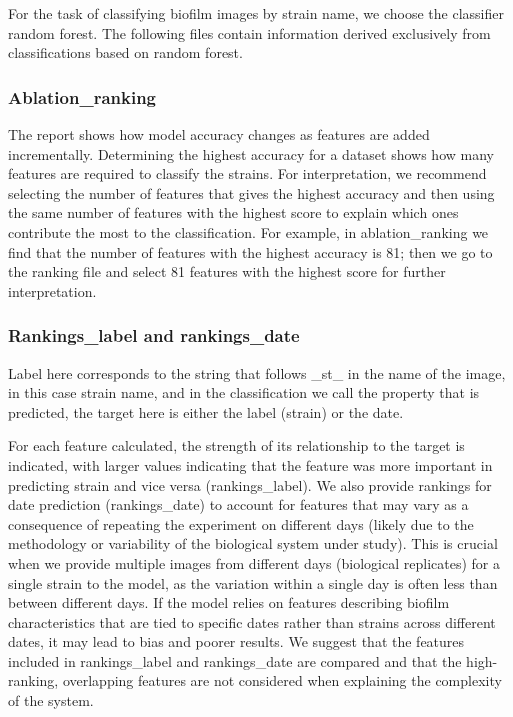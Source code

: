 \documentclass{ol-softwaremanual}
\begin{document}
For the task of classifying biofilm images by strain name, we choose the classifier random forest. The following files contain information derived exclusively from classifications based on random forest.

\subsubsection{Ablation\_ranking}
The report shows how model accuracy changes as features are added incrementally. Determining the highest accuracy for a dataset shows how many features are required to classify the strains. For interpretation, we recommend selecting the number of features that gives the highest accuracy and then using the same number of features with the highest score to explain which ones contribute the most to the classification.
For example, in ablation\_ranking we find that the number of features with the highest accuracy is 81; then we go to the ranking file and select 81 features with the highest score for further interpretation.

\subsubsection{Rankings\_label and rankings\_date}
Label here corresponds to the string that follows \_st\_ in the name of the image, in this case strain name, and in the classification we call the property that is predicted, the target here is either the label (strain) or the date.

For each feature calculated, the strength of its relationship to the target is indicated, with larger values indicating that the feature was more important in predicting strain and vice versa (rankings\_label). We also provide rankings for date prediction (rankings\_date) to account for features that may vary as a consequence of repeating the experiment on different days (likely due to the methodology or variability of the biological system under study). This is crucial when we provide multiple images from different days (biological replicates) for a single strain to the model, as the variation within a single day is often less than between different days. If the model relies on features describing biofilm characteristics that are tied to specific dates rather than strains across different dates, it may lead to bias and poorer results. We suggest that the features included in rankings\_label and rankings\_date are compared and that the high-ranking, overlapping features are not considered when explaining the complexity of the system.
\end{document}
